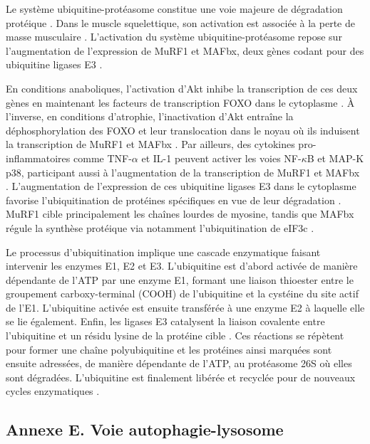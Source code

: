 \documentclass[11pt]{report}
\begin{document}
Le système ubiquitine-protéasome constitue une voie majeure de dégradation protéique \parencite{Scicchitano2015}. Dans le muscle squelettique, son activation est associée à la perte de masse musculaire \parencite{Bodine2014Aug}. L'activation du système ubiquitine-protéasome repose sur l'augmentation de l'expression de MuRF1 et MAFbx, deux gènes codant pour des ubiquitine ligases E3 \parencite{Egerman2013Nov}. 

En conditions anaboliques, l'activation d'Akt inhibe la transcription de ces deux gènes en maintenant les facteurs de transcription FOXO dans le cytoplasme \parencite{Egerman2013Nov}. À l'inverse, en conditions d'atrophie, l'inactivation d'Akt entraîne la déphosphorylation des FOXO et leur translocation dans le noyau où ils induisent la transcription de MuRF1 et MAFbx \parencite{Scicchitano2015}. Par ailleurs, des cytokines pro-inflammatoires comme TNF-$\alpha$ et IL-1 peuvent activer les voies NF-$\kappa$B et MAP-K p38, participant aussi à l'augmentation de la transcription de MuRF1 et MAFbx \parencite{Egerman2013Nov}. L'augmentation de l'expression de ces ubiquitine ligases E3 dans le cytoplasme favorise l'ubiquitination de protéines spécifiques en vue de leur dégradation \parencite{Bodine2014Aug}. MuRF1 cible principalement les chaînes lourdes de myosine, tandis que MAFbx régule la synthèse protéique via notamment l'ubiquitination de eIF3c \parencite{Egerman2013Nov}.
 
Le processus d'ubiquitination implique une cascade enzymatique faisant intervenir les enzymes E1, E2 et E3. L'ubiquitine est d'abord activée de manière dépendante de l'ATP par une enzyme E1, formant une liaison thioester entre le groupement carboxy-terminal (COOH) de l'ubiquitine et la cystéine du site actif de l'E1. L'ubiquitine activée est ensuite transférée à une enzyme E2 à laquelle elle se lie également. Enfin, les ligases E3 catalysent la liaison covalente entre l'ubiquitine et un résidu lysine de la protéine cible \parencite{Bodine2014Aug}. Ces réactions se répètent pour former une chaîne polyubiquitine et les protéines ainsi marquées sont ensuite adressées, de manière dépendante de l'ATP, au protéasome 26S où elles sont dégradées. L'ubiquitine est finalement libérée et recyclée pour de nouveaux cycles enzymatiques \parencite{Scicchitano2015}.

\newpage

\subsection*{Annexe E. Voie autophagie-lysosome} \label{annexeE}
\end{document}
